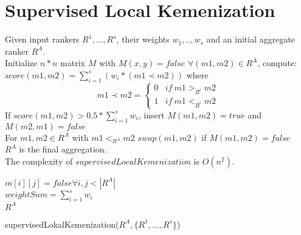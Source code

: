 \documentclass{article}
\begin{document}
        
    \section{Supervised Local Kemenization \cite{SLK}}
      	Given input rankers $R^1,...,R^s$, their weights $w_1,..,w_s$ and an initial aggregate ranker $R^A$.\\
       
       	Initialize $n*n$ matrix $M$ with $M(x, y) = false$
       	$\forall (m1, m2) \in R^A$, compute:\\    
       	$score(m1, m2) = \sum_{i = 1}^s (w_i * (m1 \prec m2))$ where\\
       	\[m1 \prec m2 =\begin{cases} 
         	0 & if~ m1 >_{R^i} m2 \\
         	1 & if~ m1 <_{R^i} m2
         \end{cases} \]
       	If $score(m1, m2) > 0.5 * \sum_{i = 1} ^ s w_i$, insert $M(m1, m2) = true$ and $M(m2, m1) = false$\\
       	For $m1, m2 \in R^A$  with $m1 <_{R^A} m2$ $swap(m1, m2)$ if $M(m1, m2) = false$\\
       	$R^A$ is the final aggregation.\\
       	The complexity of $supervisedLocalKemenization$ is $O(n^2)$.
       	
       	\begin{algorithm}[H]
       	 $m[i][j] = false \forall i, j < |R^A|$\\
       	 $weightSum = \sum_{i=1}^s w_i$\\
	   	  {
	    }
	     {
	   	}
	    \Return $R^A$
	    \caption{supervisedLokalKemenization($R^A, \{R^1,...,R^s\}$)}
	   \end{algorithm}
       
\newpage  

	      
\end{document}
